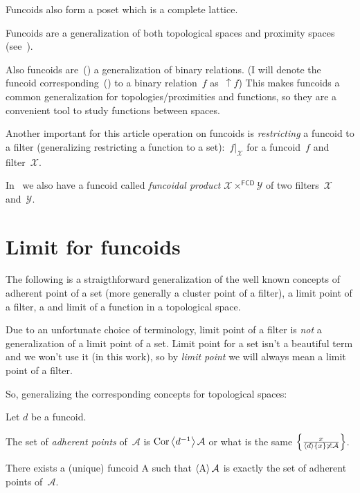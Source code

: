 Funcoids also form a poset which is a complete lattice.

Funcoids are a generalization of both topological spaces and proximity spaces (see~\cite{volume-1-edition1}).

Also funcoids are~(\cite{volume-1-edition1}) a generalization of binary relations. (I will denote the funcoid corresponding~(\cite{volume-1-edition1}) to a binary relation~$f$ as~$\uparrow f$) This makes funcoids a common generalization for topologies/proximities and functions, so they are a convenient tool to study functions between spaces.

Another important for this article operation on funcoids is \emph{restricting} a funcoid to a filter (generalizing restricting a function to a set):~$f|_{\mathcal{X}}$ for a funcoid~$f$ and filter~$\mathcal{X}$.

In~\cite{volume-1-edition1} we also have a funcoid called \emph{funcoidal product} $\mathcal{X}\times^{\mathsf{FCD}}\mathcal{Y}$ of two filters~$\mathcal{X}$ and~$\mathcal{Y}$.

\chapter{Limit for funcoids}

The following is a straigthforward generalization of the well known concepts of adherent point of a set (more generally a cluster point of a filter), a limit point of a filter, a and limit of a function in a
topological space.

\begin{note}
Due to an unfortunate choice of terminology, limit point of a filter is \emph{not} a generalization of a limit point of a set.
Limit point for a set isn't a beautiful term and we won't use it (in this work), so by \emph{limit point} we will always mean a limit point of a filter.
\end{note}

So, generalizing the corresponding concepts for topological spaces:

Let $d$ be a funcoid.

\begin{defn}
The set of \emph{adherent points} of~$\mathcal{A}$ is
$\operatorname{Cor}\left\langle d^{-1}\right\rangle\mathcal{A}$ or what is the same
$\left\{ \frac{x}{\left\langle d\right\rangle\{x\}\not\asymp\mathcal{A}}\right\}$.
\end{defn}

\begin{prop}
There exists a (unique) funcoid $\mathrm{A}$ such that
$\left\langle \mathrm{A}\right\rangle\mathcal{A}$ is exactly the set of adherent points of~$\mathcal{A}$.
\end{prop}

